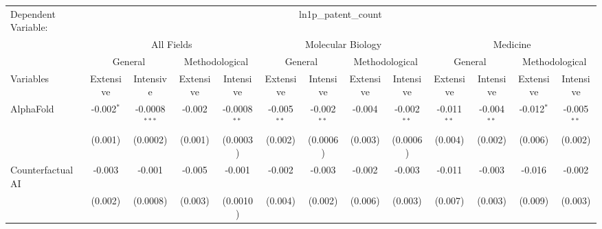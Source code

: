 \begingroup
\centering
\begin{tabular}{lcccccccccccc}
   \tabularnewline \midrule \midrule
   Dependent Variable: & \multicolumn{12}{c}{ln1p\_patent\_count}\\
 & \multicolumn{4}{c}{All Fields} & \multicolumn{4}{c}{Molecular Biology} & \multicolumn{4}{c}{Medicine} \\
\cmidrule(lr){2-5} \cmidrule(lr){6-9} \cmidrule(lr){10-13}
 & \multicolumn{2}{c}{General} & \multicolumn{2}{c}{Methodological} & \multicolumn{2}{c}{General} & \multicolumn{2}{c}{Methodological} & \multicolumn{2}{c}{General} & \multicolumn{2}{c}{Methodological} \\
\cmidrule(lr){2-3} \cmidrule(lr){4-5} \cmidrule(lr){6-7} \cmidrule(lr){8-9} \cmidrule(lr){10-11} \cmidrule(lr){12-13}
Variables & \multicolumn{1}{c}{Extensive} & \multicolumn{1}{c}{Intensive} & \multicolumn{1}{c}{Extensive} & \multicolumn{1}{c}{Intensive} & \multicolumn{1}{c}{Extensive} & \multicolumn{1}{c}{Intensive} & \multicolumn{1}{c}{Extensive} & \multicolumn{1}{c}{Intensive} & \multicolumn{1}{c}{Extensive} & \multicolumn{1}{c}{Intensive} & \multicolumn{1}{c}{Extensive} & \multicolumn{1}{c}{Intensive} \\
\cmidrule(lr){1-1}\cmidrule(lr){2-2} \cmidrule(lr){3-3} \cmidrule(lr){4-4} \cmidrule(lr){5-5} \cmidrule(lr){6-6} \cmidrule(lr){7-7} \cmidrule(lr){8-8} \cmidrule(lr){9-9} \cmidrule(lr){10-10} \cmidrule(lr){11-11} \cmidrule(lr){12-12} \cmidrule(lr){13-13}
   AlphaFold                                & -0.002$^{*}$  & -0.0008$^{***}$ & -0.002        & -0.0008$^{**}$ & -0.005$^{**}$ & -0.002$^{**}$ & -0.004       & -0.002$^{**}$ & -0.011$^{**}$ & -0.004$^{**}$  & -0.012$^{*}$  & -0.005$^{**}$\\   
                                            & (0.001)       & (0.0002)        & (0.001)       & (0.0003)       & (0.002)       & (0.0006)      & (0.003)      & (0.0006)      & (0.004)       & (0.002)        & (0.006)       & (0.002)\\   
   Counterfactual AI                        & -0.003        & -0.001          & -0.005        & -0.001         & -0.002        & -0.003        & -0.002       & -0.003        & -0.011        & -0.003         & -0.016        & -0.002\\   
                                            & (0.002)       & (0.0008)        & (0.003)       & (0.0010)       & (0.004)       & (0.002)       & (0.006)      & (0.003)       & (0.007)       & (0.003)        & (0.009)       & (0.003)\\   

\end{tabular}
